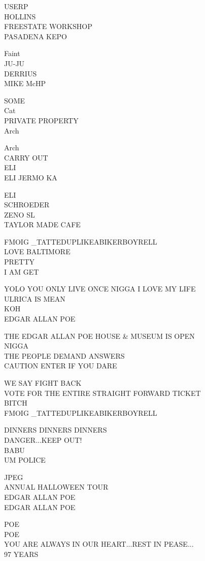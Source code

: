 \documentclass[10pt,letterpaper]{article}
\begin{document}
USERP\\
HOLLINS\\
FREESTATE WORKSHOP\\
PASADENA KEPO

Faint\\
JU{-}JU\\
DERRIUS\\
MIKE McHP

SOME\\
Cat\\
PRIVATE PROPERTY\\
Arch

Arch\\
CARRY OUT\\
ELI\\
ELI JERMO KA

ELI\\
SCHROEDER\\
ZENO SL\\
TAYLOR MADE CAFE

FMOIG \_TATTEDUPLIKEABIKERBOYRELL\\
LOVE BALTIMORE\\
PRETTY\\
I AM GET

YOLO YOU ONLY LIVE ONCE NIGGA I LOVE MY LIFE\\
ULRICA IS MEAN\\
KOH\\
EDGAR ALLAN POE

THE EDGAR ALLAN POE HOUSE \& MUSEUM IS OPEN\\
NIGGA\\
THE PEOPLE DEMAND ANSWERS\\
CAUTION ENTER IF YOU DARE

WE SAY FIGHT BACK\\
VOTE FOR THE ENTIRE STRAIGHT FORWARD TICKET\\
BITCH\\
FMOIG \_TATTEDUPLIKEABIKERBOYRELL

DINNERS DINNERS DINNERS\\
DANGER...KEEP OUT!\\
BABU\\
UM POLICE

JPEG\\
ANNUAL HALLOWEEN TOUR\\
EDGAR ALLAN POE\\
EDGAR ALLAN POE

POE\\
POE\\
YOU ARE ALWAYS IN OUR HEART...REST IN PEASE...\\
97 YEARS
\end{document}
